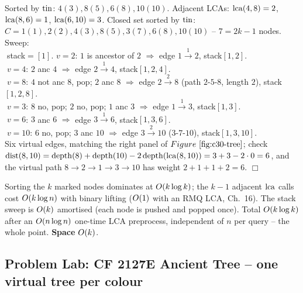 \begin{tracebox}[The stack sweep on \(S=\{4,8,6,10\}\) of the running tree \(T\)]
Sorted by \(\operatorname{tin}\): \(4(3),8(5),6(8),10(10)\).  Adjacent LCAs: \(\operatorname{lca}(4,8)=2\),
\(\operatorname{lca}(8,6)=1\), \(\operatorname{lca}(6,10)=3\).  Closed set sorted by \(\operatorname{tin}\):
\(C=1(1),2(2),4(3),8(5),3(7),6(8),10(10)\) -- \(7=2k-1\) nodes.  Sweep:\\
\(\;\)stack\(=[1]\).  \(v=2\): \(1\) is ancestor of \(2\) \(\Rightarrow\) edge \(1\!\xrightarrow{\;1\;}\!2\), stack\([1,2]\).\\
\(\;\)\(v=4\): \(2\) anc \(4\) \(\Rightarrow\) edge \(2\!\xrightarrow{\;1\;}\!4\), stack\([1,2,4]\).\\
\(\;\)\(v=8\): \(4\) not anc \(8\), pop; \(2\) anc \(8\) \(\Rightarrow\) edge \(2\!\xrightarrow{\;2\;}\!8\) (path \(2\text{-}5\text{-}8\), length \(2\)), stack\([1,2,8]\).\\
\(\;\)\(v=3\): \(8\) no, pop; \(2\) no, pop; \(1\) anc \(3\) \(\Rightarrow\) edge \(1\!\xrightarrow{\;1\;}\!3\), stack\([1,3]\).\\
\(\;\)\(v=6\): \(3\) anc \(6\) \(\Rightarrow\) edge \(3\!\xrightarrow{\;1\;}\!6\), stack\([1,3,6]\).\\
\(\;\)\(v=10\): \(6\) no, pop; \(3\) anc \(10\) \(\Rightarrow\) edge \(3\!\xrightarrow{\;2\;}\!10\) (\(3\text{-}7\text{-}10\)), stack\([1,3,10]\).\\
Six virtual edges, matching the right panel of \(\figref{c30-tree}\); check
\(\operatorname{dist}(8,10)=\operatorname{depth}(8)+\operatorname{depth}(10)-2\operatorname{depth}(\operatorname{lca}(8,10))=3+3-2\cdot0=6\), and the
virtual path \(8\!\to\!2\!\to\!1\!\to\!3\!\to\!10\) has weight \(2+1+1+2=6\). \(\Box\)
\end{tracebox}

\begin{complexitybox}[Construction]
Sorting the \(k\) marked nodes dominates at \(O(k\log k)\); the \(k-1\) adjacent
\(\operatorname{lca}\) calls cost \(O(k\log n)\) with binary lifting (\(O(1)\) with an RMQ
LCA, Ch.~16).  The stack sweep is \(O(k)\) amortised (each node is pushed and
popped once).  Total \(O(k\log k)\) after an \(O(n\log n)\) one-time LCA
preprocess, independent of \(n\) per query -- the whole point. \textbf{Space}
\(O(k)\).
\end{complexitybox}

\subsection{Problem Lab: CF 2127E Ancient Tree -- one virtual tree per colour}

